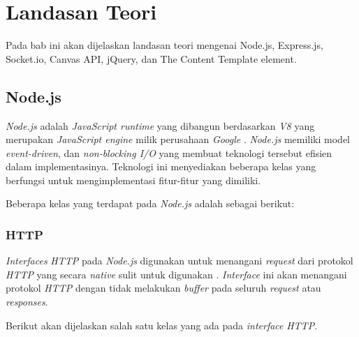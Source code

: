 \chapter{Landasan Teori}
\label{chap:teori}

Pada bab ini akan dijelaskan landasan teori mengenai Node.js, Express.js, Socket.io, Canvas API, jQuery, dan The Content Template element.

\section{Node.js}


\label{sec:Node.js}

\textit{Node.js} adalah \textit{JavaScript runtime} yang dibangun berdasarkan \textit{V8} yang merupakan \textit{JavaScript engine} milik perusahaan \textit{Google} \cite{dahl:09:nodejs}. \textit{Node.js} memiliki model \textit{event-driven}, dan \textit{non-blocking I/O} yang membuat teknologi tersebut efisien dalam implementasinya. Teknologi ini menyediakan beberapa kelas yang berfungsi untuk mengimplementasi fitur-fitur yang dimiliki.

Beberapa kelas yang terdapat pada \textit{Node.js} adalah sebagai berikut: 

\subsection{HTTP}
\textit{Interfaces} \textit{HTTP} pada \textit{Node.js} digunakan untuk menangani \textit{request} dari protokol \textit{HTTP} yang secara \textit{native} sulit untuk digunakan \cite{dahl:09:nodejsdocs}. \textit{Interface} ini akan menangani protokol \textit{HTTP} dengan tidak melakukan \textit{buffer} pada seluruh \textit{request} atau \textit{responses}.

Berikut akan dijelaskan salah satu kelas yang ada pada \textit{interface} \textit{HTTP}.

